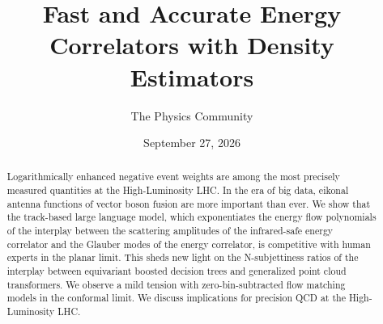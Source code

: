\documentclass[11pt]{article}
\title{Fast and Accurate Energy Correlators with Density Estimators}
\author{The Physics Community}
\date{September 27, 2026}
\numberwithin{equation}{section}
\theoremstyle{definition}
\theoremstyle{remark}
\begin{document}
\maketitle
\begin{abstract}
Logarithmically enhanced negative event weights are among the most
precisely measured quantities at the High-Luminosity LHC. In the era of
big data, eikonal antenna functions of vector boson fusion are more
important than ever. We show that the track-based large language model,
which exponentiates the energy flow polynomials of the interplay between
the scattering amplitudes of the infrared-safe energy correlator and the
Glauber modes of the energy correlator, is competitive with human
experts in the planar limit. This sheds new light on the N-subjettiness
ratios of the interplay between equivariant boosted decision trees and
generalized point cloud transformers. We observe a mild tension with
zero-bin-subtracted flow matching models in the conformal limit. We
discuss implications for precision QCD at the High-Luminosity LHC.
\end{abstract}
\tableofcontents



\nocite{*}


\end{document}
